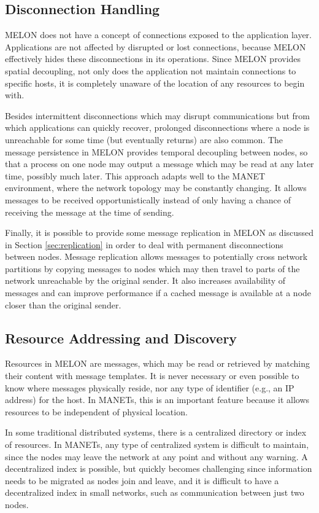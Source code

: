 \subsection{Disconnection Handling}

MELON does not have a concept of connections exposed to the application layer. Applications are not affected by disrupted or lost connections, because MELON effectively hides these disconnections in its operations. Since MELON provides spatial decoupling, not only does the application not maintain connections to specific hosts, it is completely unaware of the location of any resources to begin with.

Besides intermittent disconnections which may disrupt communications but from which applications can quickly recover, prolonged disconnections where a node is unreachable for some time (but eventually returns) are also common. The message persistence in MELON provides temporal decoupling between nodes, so that a process on one node may output a message which may be read at any later time, possibly much later. This approach adapts well to the MANET environment, where the network topology may be constantly changing. It allows messages to be received opportunistically instead of only having a chance of receiving the message at the time of sending.

Finally, it is possible to provide some message replication in MELON as discussed in Section \ref{sec:replication} in order to deal with permanent disconnections between nodes. Message replication allows messages to potentially cross network partitions by copying messages to nodes which may then travel to parts of the network unreachable by the original sender. It also increases availability of messages and can improve performance if a cached message is available at a node closer than the original sender.

\subsection{Resource Addressing and Discovery}

Resources in MELON are messages, which may be read or retrieved by matching their content with message templates. It is never necessary or even possible to know where messages physically reside, nor any type of identifier (e.g., an IP address) for the host. In MANETs, this is an important feature because it allows resources to be independent of physical location.

In some traditional distributed systems, there is a centralized directory or index of resources. In MANETs, any type of centralized system is difficult to maintain, since the nodes may leave the network at any point and without any warning. A decentralized index is possible, but quickly becomes challenging since information needs to be migrated as nodes join and leave, and it is difficult to have a decentralized index in small networks, such as communication between just two nodes.


